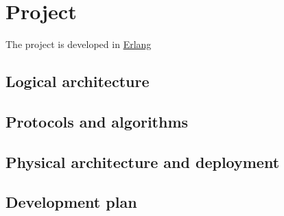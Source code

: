 \documentclass{memoir}
\begin{document}
\chapter{Project}\label{ch:project}

The project is developed in \href{https://www.erlang.org/}{Erlang}

\section{Logical architecture}

\section{Protocols and algorithms}

\section{Physical architecture and deployment}

\section{Development plan}











\end{document}
